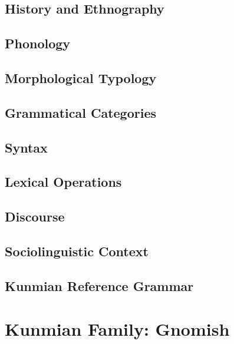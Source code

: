 \documentclass[12pt,letterpaper,openany,twoside]{memoir}
\let\originalpart=\part
\def\part{\cleardoublepage\originalpart}
\begin{document}
\chapter{History and Ethnography}

\chapter{Phonology}

\chapter{Morphological Typology}

\chapter{Grammatical Categories}

\chapter{Syntax}

\chapter{Lexical Operations}

\chapter{Discourse}

\chapter{Sociolinguistic Context}

\chapter{Kunmian Reference Grammar}

\part{Kunmian Family: Gnomish}
\end{document}

